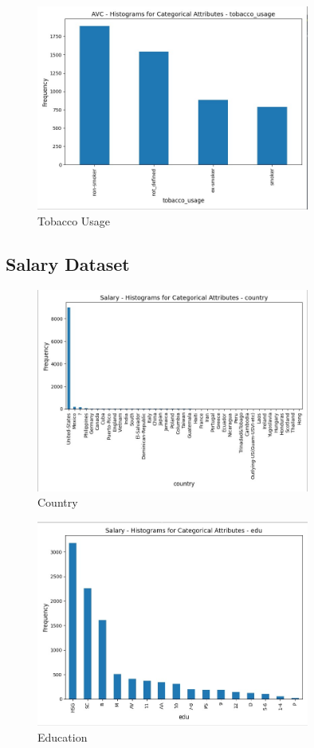 \documentclass[a4paper,12pt]{article}
\begin{document}
\begin{figure}[H]
    \centering
    \includegraphics[width=0.8\textwidth]{Resources/histogram_tobacco_usage.jpeg}
    \caption{Tobacco Usage}
\end{figure}

\subsection{Salary Dataset}
\begin{figure}[H]
    \centering
    \includegraphics[width=0.8\textwidth]{Resources/histogram_country.jpeg}
    \caption{Country}
\end{figure}

\begin{figure}[H]
    \centering
    \includegraphics[width=0.8\textwidth]{Resources/histogram_edu.jpeg}
    \caption{Education}
\end{figure}
\end{document}
